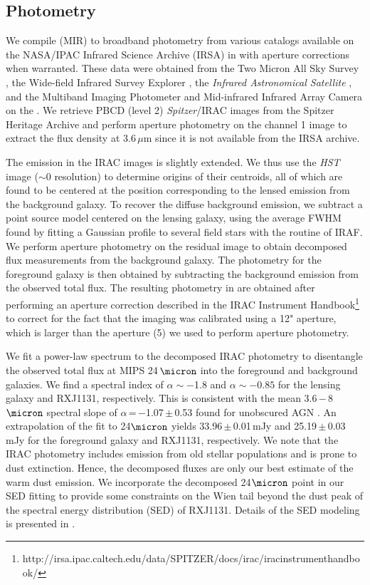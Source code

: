 \documentclass[]{emulateapj}
\begin{document}
\subsection{Photometry} \label{sec:photometry} %
We compile \mir (MIR) to \fir broadband photometry from various
catalogs available on the NASA/IPAC Infrared Science
Archive (IRSA) in  with aperture corrections
when warranted. These data were obtained from
the Two Micron All Sky Survey \citep[2MASS;][]{Skrutskie06a},
the Wide-field Infrared Survey Explorer \citep[{\it WISE};][]{Wright10a},
the {\it Infrared Astronomical Satellite}
\citep[{\it IRAS};][]{Neugebauer84a}, and
the Multiband Imaging Photometer \citep[MIPS;][]{Rieke04a} and
Mid-infrared Infrared Array Camera \citep[IRAC;][]{Fazio04a} on
the \spitzer.
We retrieve PBCD (level 2) {\it Spitzer}/IRAC images from the
Spitzer Heritage Archive and perform aperture photometry on
the channel 1 image to extract the flux density at 3.6\,$\mu$m
since it is not available from the IRSA archive.

The emission in the IRAC images is slightly extended. We thus use the
{\it HST} image ($\sim$0 resolution) to determine
origins of their centroids, all of which are found to be
centered at the position corresponding to the lensed emission from the
background galaxy. To recover the diffuse background emission, we subtract a
point source model centered on the lensing galaxy, using the average
FWHM found by fitting a Gaussian profile to several field stars
with the  routine of IRAF.
We perform aperture photometry on the residual image
to obtain decomposed flux measurements from the background galaxy.
The photometry for the foreground galaxy is then obtained
by subtracting the background emission from the
observed total flux. The resulting photometry in
 are obtained after performing an aperture correction
described in the IRAC Instrument Handbook\footnote{http://irsa.ipac.caltech.edu/data/SPITZER/docs/irac/iracinstrumenthandbook/} to
correct for the fact that the imaging was calibrated
using a 12" aperture, which is larger than the aperture (5) we used to
perform aperture photometry.

We fit a power-law spectrum to the
decomposed IRAC photometry to disentangle the observed total flux
at MIPS 24\,$\micron$ into the foreground and
background galaxies. We find a spectral index of $\alpha\sim-$1.8 and
$\alpha\sim-0.85$ for the lensing galaxy and RXJ1131, respectively.
This is consistent with the mean 3.6\,$-$\,8\,$\micron$
spectral slope of
$\alpha$\,=\,$-$1.07\,$\pm$\,0.53 found for unobscured AGN
\citep{Stern05a}. An extrapolation of the fit to 24$\micron$
yields 33.96\,$\pm$\,0.01\,mJy and 25.19\,$\pm$\,0.03\,mJy
for the foreground galaxy and RXJ1131, respectively.
We note that the IRAC photometry includes
emission from old stellar populations and is prone to
dust extinction. Hence, the decomposed fluxes are only
our best estimate of the warm dust emission.
We incorporate the decomposed 24$\micron$ point in our
SED fitting to provide some constraints on
the Wien tail beyond the dust peak
of the spectral energy distribution (SED) of RXJ1131.
Details of the SED modeling is presented in .
\end{document}
